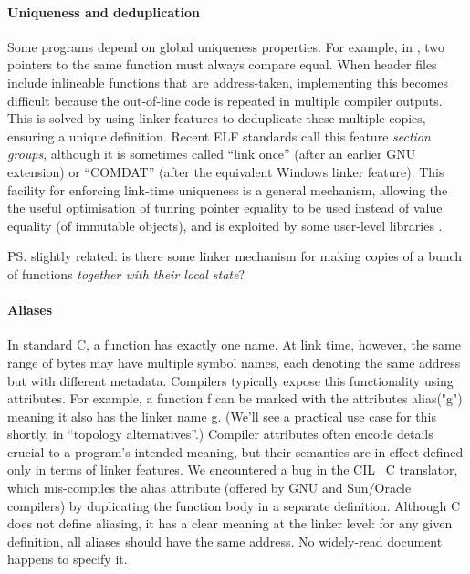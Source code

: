 \paragraph{Uniqueness and deduplication}
Some programs depend on global uniqueness properties. 
For example, in \Cplusplus{}, two pointers to the same function
must always compare equal.
When header files include inlineable functions that are address-taken, 
implementing this becomes difficult because the
out-of-line code is repeated in multiple compiler outputs.
This is solved by using linker features 
to deduplicate these multiple copies, ensuring a unique definition.
Recent ELF standards call this feature \emph{section groups},
although it is sometimes called ``link once'' (after an earlier GNU extension) or
``COMDAT'' (after the equivalent Windows linker feature).
This facility for enforcing link-time uniqueness 
is a general mechanism, allowing the 
the useful optimisation of tunring pointer equality to be used instead of value equality 
(of immutable objects),
and is exploited by some user-level libraries \citep{kell_towards_2015}.



\ps{slightly related: is there some linker mechanism for making copies
  of a bunch of functions \emph{together with their local state}?}

\paragraph{Aliases}
In standard C, a function has exactly one name. 
At link time, however, the same range of bytes may have multiple symbol names, 
each denoting the same address but with different metadata.
Compilers typically expose this functionality using attributes.
For example, a function \textsf{f} can be marked with the attributes \textsf{alias("g")}
meaning it also has the linker name \textsf{g}.
(We'll see a practical use case for this shortly, in ``topology alternatives''.)
Compiler attributes often encode details crucial to a program's intended meaning,
but their semantics are in effect defined only in terms of linker features.
We encountered a bug in the CIL~\cite{necula-cil-2002} C translator, which mis-compiles the \textsf{alias} attribute
(offered by GNU and Sun/Oracle compilers)
by duplicating the function body in a separate definition.
Although C does not define aliasing, 
it has a clear meaning at the linker level: for any given definition, all aliases should have the same address.
No widely-read document happens to specify it.

